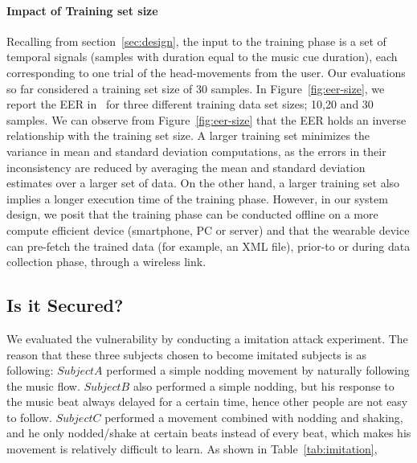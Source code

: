 \paragraph{Impact of Training set size}
Recalling from \systemname section~\ref{sec:design}, the input to the training phase
is a set of temporal signals (samples with duration equal to the music cue 
duration), each corresponding to one trial of the head-movements from the 
user. Our evaluations so far considered a training set size of 30 samples. 
In Figure~\ref{fig:eer-size}, we report the EER in \systemname~for three 
different training data set sizes; 10,20 and 30 samples.
We can observe from Figure~\ref{fig:eer-size} that the EER holds an inverse 
relationship with the training set size. A larger training set minimizes the 
variance in mean and standard deviation computations, as the errors in their 
inconsistency are reduced by averaging the mean and standard deviation 
estimates over a larger set of data. 
On the other hand, a larger training set also implies a longer execution time 
of the training phase.
However, in our system design, we posit that the training phase can be 
conducted 
offline on a more compute efficient device (smartphone, PC or server) and that 
the wearable device can pre-fetch the trained data (for example, an XML file), 
prior-to or during data collection phase, through a wireless link.

\subsection{Is it Secured?}
We evaluated the vulnerability by conducting a imitation attack experiment. The reason that these three subjects chosen to become imitated subjects is as following: $Subject A$ performed a simple nodding movement by naturally following the music flow. $Subject B$ also performed a simple nodding, but his response to the music beat always delayed for a certain time, hence other people are not easy to follow. $Subject C$ performed a movement combined with nodding and shaking, and he only nodded/shake at certain beats instead of every beat, which makes his movement is relatively difficult to learn. As shown in Table~\ref{tab:imitation}, 

